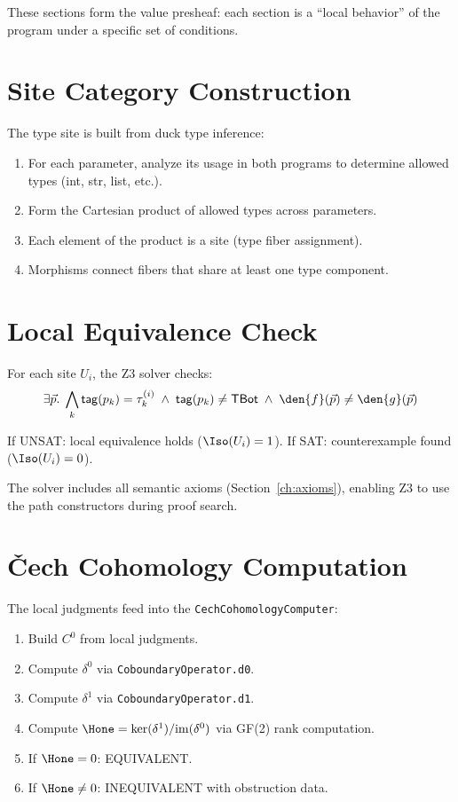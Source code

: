 These sections form the value presheaf: each section is a
``local behavior'' of the program under a specific set of conditions.

\section{Site Category Construction}

The type site is built from duck type inference:
\begin{enumerate}
  \item For each parameter, analyze its usage in both programs to
    determine allowed types (int, str, list, etc.).
  \item Form the Cartesian product of allowed types across parameters.
  \item Each element of the product is a site (type fiber assignment).
  \item Morphisms connect fibers that share at least one type component.
\end{enumerate}

\section{Local Equivalence Check}

For each site $U_i$, the Z3 solver checks:
\[
  \exists \vec{p}.\; \bigwedge_k \mathsf{tag}(p_k) = \tau_k^{(i)}
  \;\land\; \mathsf{tag}(p_k) \neq \mathsf{TBot}
  \;\land\; \den{f}(\vec{p}) \neq \den{g}(\vec{p})
\]

If UNSAT: local equivalence holds ($\Iso(U_i) = 1$).
If SAT: counterexample found ($\Iso(U_i) = 0$).

The solver includes all semantic axioms (Section~\ref{ch:axioms}),
enabling Z3 to use the path constructors during proof search.

\section{\v{C}ech Cohomology Computation}

The local judgments feed into the \texttt{CechCohomologyComputer}:
\begin{enumerate}
  \item Build $C^0$ from local judgments.
  \item Compute $\delta^0$ via \texttt{CoboundaryOperator.d0}.
  \item Compute $\delta^1$ via \texttt{CoboundaryOperator.d1}.
  \item Compute $\Hone = \ker(\delta^1) / \mathrm{im}(\delta^0)$
    via GF(2) rank computation.
  \item If $\Hone = 0$: EQUIVALENT.
  \item If $\Hone \neq 0$: INEQUIVALENT with obstruction data.
\end{enumerate}


